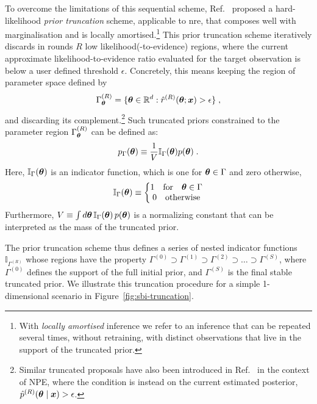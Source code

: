 To overcome the limitations of this sequential scheme, Ref.~\cite{Miller:2021aa} proposed a hard-likelihood \emph{prior truncation} scheme, applicable to \gls*{nre}, that composes well with marginalisation and is locally amortised.\footnote{With \emph{locally amortised} inference we refer to an inference that can be repeated several times, without retraining, with distinct observations that live in the support of the truncated prior.}
This prior truncation scheme iteratively discards in rounds $R$ low likelihood(-to-evidence) regions, where the current approximate likelihood-to-evidence ratio evaluated for the target observation is below a user defined threshold $\epsilon$. Concretely, this means keeping the region of parameter space defined by
\begin{equation}\label{eq:gamma_r}
    \Gamma^{(R)}_{\bm{\theta}} = \{ \bm{\theta} \in \mathbb R^d : \hat{r}^{(R)}(\bm{\theta} ; \bm{x}) > \epsilon\} \;,
\end{equation}
and discarding its complement.\footnote{Similar truncated proposals have also been introduced in Ref.~\cite{Deistler:2022aa} in the context of NPE, where the condition is instead on the current estimated posterior, \eg~$\hat{p}^{(R)}(\bm{\theta} \mid\bm{x}) > \epsilon$.
}
Such truncated priors constrained to the parameter region $\Gamma^{(R)}_{\bm{\theta}}$ can be defined as:
\begin{equation}
    \label{eqn:truncated_prior}
    p_\Gamma(\bm{\theta}) \equiv  \frac1V \mathbb{I}_{\Gamma}(\bm{\theta}) p(\bm{\theta})\;.
\end{equation}
Here, $\mathbb{I}_{\Gamma}(\bm{\theta})$ is an indicator function, which is one for $\bm{\theta} \in \Gamma$ and zero otherwise,
\begin{equation}
\mathbb{I}_\Gamma(\bm{\theta}) \equiv \left\{
\begin{matrix}
1 \quad \text{for} \quad \bm{\theta} \in \Gamma\\
0 \quad \text{otherwise}
\end{matrix}
\right.
\end{equation}
Furthermore,  $V \equiv \int d\bm{\theta}\, \mathbb{I}_\Gamma(\bm{\theta})\, p(\bm{\theta})$ is a normalizing constant that can be interpreted as the mass of the truncated prior.

The prior truncation scheme thus defines a series of nested indicator functions $\mathbb{I}_{\Gamma^{(R)}}$ whose regions have the property $\Gamma^{(0)}  \supset \Gamma^{(1)}  \supset \Gamma^{(2)} \supset \dots \supset \Gamma^{(S)}$, where $\Gamma^{(0)}$ defines the support of the full initial prior, and $\Gamma^{(S)}$ is the final stable truncated prior. We illustrate this truncation procedure for a simple 1-dimensional scenario in Figure~\ref{fig:sbi-truncation}.

